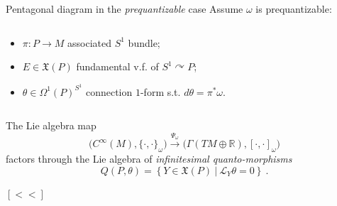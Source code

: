 \documentclass[10pt]{beamer}
\begin{document}
\begin{frame}[fragile]{Pentagonal diagram in the \emph{prequantizable} case}\label{frame:pentagonPrequantum}
	Assume $\omega$ is \alert{prequantizable}:
	\pause
		\begin{columns}
			\begin{column}{.6\linewidth}
				\begin{itemize}
					\item<2-> $\pi:P\to M$ \small associated $S^1$ bundle;
					\item<3-> $E\in \mathfrak{X}(P)$ \small fundamental v.f. of $S^1\curvearrowright P$;
					\item<4-> $\theta\in \Omega^1(P)^{S^1}$ \small connection $1$-form  s.t. $d \theta = \pi^\ast \omega$.
				\end{itemize}
			\end{column}
			\begin{column}{.4\linewidth}
				\begin{center}
					
				\end{center}	
			\end{column}
		\end{columns}
	\pause \pause \vfill
	\pause
	The Lie algebra map
	\begin{displaymath}
		\big(C^\infty(M),\{\cdot,\cdot\}_\omega\big) \xrightarrow{\Psi_\omega} 
		\big(\Gamma(TM\oplus\mathbb{R}),[\cdot,\cdot]_\omega\big)
	\end{displaymath}
	\vfill
	factors through the Lie algebra of \emph{\alert{infinitesimal quanto-morphisms}}
	\pause
	\begin{displaymath}
		Q(P,\theta)= \left \lbrace 
			Y \in \mathfrak{X}(P) 
			~ \Big\vert ~
			\mathcal{L}_Y \theta = 0
			\right \rbrace~.
	\end{displaymath}		
	
	
	\hfill \hyperlink{frame:scopeTalk}{\color{gray}$[<<]$}%
\end{frame}
\end{document}
